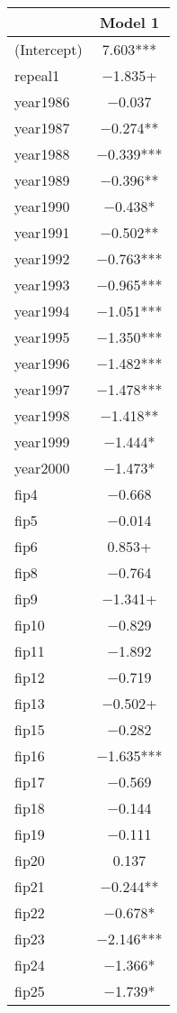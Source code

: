 \documentclass[
]{article}
\begin{document}
\begin{table}
\centering
\begin{tabular}[t]{lc}
\toprule
  & Model 1\\
\midrule
(Intercept) & \num{7.603}***\\
repeal1 & \num{-1.835}+\\
year1986 & \num{-0.037}\\
year1987 & \num{-0.274}**\\
year1988 & \num{-0.339}***\\
year1989 & \num{-0.396}**\\
year1990 & \num{-0.438}*\\
year1991 & \num{-0.502}**\\
year1992 & \num{-0.763}***\\
year1993 & \num{-0.965}***\\
year1994 & \num{-1.051}***\\
year1995 & \num{-1.350}***\\
year1996 & \num{-1.482}***\\
year1997 & \num{-1.478}***\\
year1998 & \num{-1.418}**\\
year1999 & \num{-1.444}*\\
year2000 & \num{-1.473}*\\
fip4 & \num{-0.668}\\
fip5 & \num{-0.014}\\
fip6 & \num{0.853}+\\
fip8 & \num{-0.764}\\
fip9 & \num{-1.341}+\\
fip10 & \num{-0.829}\\
fip11 & \num{-1.892}\\
fip12 & \num{-0.719}\\
fip13 & \num{-0.502}+\\
fip15 & \num{-0.282}\\
fip16 & \num{-1.635}***\\
fip17 & \num{-0.569}\\
fip18 & \num{-0.144}\\
fip19 & \num{-0.111}\\
fip20 & \num{0.137}\\
fip21 & \num{-0.244}**\\
fip22 & \num{-0.678}*\\
fip23 & \num{-2.146}***\\
fip24 & \num{-1.366}*\\
fip25 & \num{-1.739}*\\

\end{tabular}
\end{table}
\end{document}
